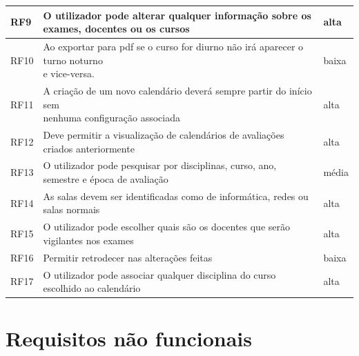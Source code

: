 \documentclass[11pt, twoside]{report}
\begin{document}
\begin{table}[H]
\begin{tabular}{|l|l|l|}
			RF9& O utilizador pode alterar qualquer informação sobre os exames, docentes ou os cursos&alta\\
			\hline
			RF10&\makecell[l]{Ao exportar para pdf se o curso for diurno não irá aparecer o turno noturno \\e vice-versa.}&baixa\\
			\hline
			RF11&\makecell[l]{A criação de um novo calendário deverá sempre partir do início sem \\nenhuma configuração associada}&alta\\
			\hline
			RF12&Deve permitir a visualização de calendários de avaliações criados anteriormente &alta\\
			\hline
			RF13&O utilizador pode pesquisar por disciplinas, curso, ano, semestre e época de avaliação&média\\
			\hline
			RF14&As salas devem ser identificadas como de informática, redes ou salas normais &alta\\
			\hline
			RF15&O utilizador pode escolher quais são os docentes que serão vigilantes nos exames&alta\\
			\hline
			RF16&Permitir retrodecer nas alterações feitas&baixa\\
			\hline
			RF17&O utilizador pode associar qualquer disciplina do curso escolhido ao calendário&alta\\
			\hline
		\end{tabular}
		\label{requisitosfuncionais}
	\end{table}
	
	
	\section{Requisitos não funcionais}
	
	
	
\end{document}
